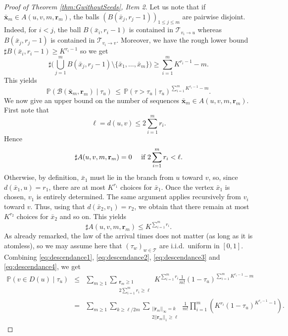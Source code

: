 \documentclass[french]{article}
\renewcommand{\P}{\mathbb{P}}
\newcommand{\T}{\mathcal{T}}
\renewcommand{\1}{\mathds{1}}
\begin{document}
\begin{proof}[Proof of Theorem \ref{thm:GwithoutSeeds}, Item 2]
Let us note that if $\bar{\mathbf{x}}_m\in A(u,v,m,\mathbf{r}_m)$, the balls $ (B(\bar{x}_{j},r_j-1))_{1\le j\le m}$ are pairwise disjoint. Indeed, for $i<j$, the ball $B(\bar{x}_{i},r_i-1)$ is contained in $\T_{v_i\to u}$
whereas $B(\bar{x}_{j},r_j-1)$ is contained in $\T_{v_i\to v}$. Moreover, we have the rough lower bound $\sharp B(\bar{x}_{i},r_i-1)\ge K^{r_i-1}$ so we get 
$$ \sharp \Big(\bigcup_{j=1}^m B(\bar{x}_{j},r_j-1)\setminus\{\bar{x}_1,\ldots,\bar{x}_m\}\Big) \ge \sum_{i=1}^m K^{r_i-1}-m.$$
This yields
\begin{equation}\label{eq:descendance2}
  \P( \mathcal{B}(\bar{\mathbf{x}}_m,\mathbf{r}_m) \mid \tau_u) \,\le\, \P( \tau>\tau_u \mid \tau_u)^{\sum_{i=1}^m K^{r_i-1}-m}.
\end{equation}
We now give an upper bound on the number of sequences $\bar{\mathbf{x}}_m\in A(u,v,m,\mathbf{r}_m)$. First note that 
$$\ell=d(u,v)\le 2\sum_{i=1}^m r_i.$$
Hence 
\begin{equation}\label{eq:descendance3}
  \sharp A(u,v,m,\mathbf{r}_m)=0 \quad \hbox{ if }  2\sum_{i=1}^m r_i<\ell.
\end{equation}
Otherwise, by definition, $\bar{x}_1$ must lie in the branch from $u$ toward $v$, so, since $d(\bar{x}_1,u)=r_1$, there are at most $K^{r_1}$ choices for $\bar{x}_1$. Once the vertex $\bar{x}_1$ is chosen, $v_1$ is entirely determined. The same argument applies recursively from $v_i$ toward $v$. Thus, using that $d(\bar{x}_2,v_1)=r_2$, we obtain that there remain at most $K^{r_2}$ choices for $\bar{x}_2$ and so on. This yields
\begin{equation}\label{eq:descendance4}
  \sharp A(u,v,m,\mathbf{r}_m) \le K^{\sum_{i=1}^m r_i}.
\end{equation}
As already remarked, the law of the arrival times does not matter (as long as it is atomless), so we may assume here that $(\tau_w)_{w\in \T}$ are i.i.d.\ uniform in $[0,1]$. Combining \eqref{eq:descendance1}, \eqref{eq:descendance2}, \eqref{eq:descendance3} and \eqref{eq:descendance4}, we get
 \begin{eqnarray*}    \P(v\in D(u)\mid \tau_u) 
&\le & \sum_{m\ge 1} \sum_{\substack{\mathbf{r}_m\ge 1\\ 2\sum_{i=1}^m r_i\ge \ell}}K^{\sum_{i=1}^m r_i} \frac{1}{m!} (1-\tau_u)^{\sum_{i=1}^m K^{r_i-1}-m}\\
&=&\sum_{m\ge 1} \sum_{k\ge \ell/2m}\sum_{\substack{||\mathbf{r}_m||_{\infty}=k \\ 2||\mathbf{r}_m||_{1}\ge \ell}}\frac{1}{m!}\prod_{i=1}^m\left(K^{ r_i}  (1-\tau_u)^{ K^{r_i-1}-1}\right).

\end{eqnarray*}
\end{proof}
\end{document}
